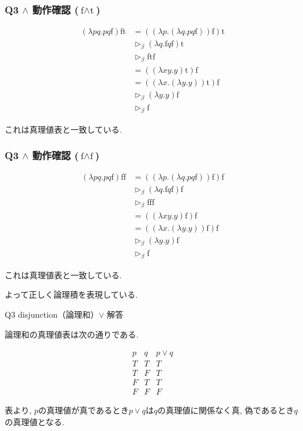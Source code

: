 \begin{frame}[fragile]

\frametitle{Q3 $\land$ 動作確認 ($\text{f}\land \text{t}$)}

\begin{align*}
(\lambda pq.pq\mathrm{f})\mathrm{ft}
&=
((\lambda p.(\lambda q.pq\mathrm{f}))
\mathrm{f})\mathrm{t}
\\
&\triangleright_{\beta}
(\lambda q.\mathrm{f}q\mathrm{f})\mathrm{t}
\\
&\triangleright_{\beta}
\mathrm{ftf}
\\
&=
((\lambda xy.y)\mathrm{t})\mathrm{f}
\\
&=
((\lambda x.(\lambda y.y))
\mathrm{t})\mathrm{f}
\\
&\triangleright_{\beta}
(\lambda y.y)\mathrm{f}
\\
&\triangleright_{\beta}
\mathrm{f}
\end{align*}

これは真理値表と一致している.

\end{frame}

\begin{frame}[fragile]

\frametitle{Q3 $\land$ 動作確認 ($\text{f}\land \text{f}$)}

\begin{align*}
(\lambda pq.pq\mathrm{f})\mathrm{ff}
&=
((\lambda p.(\lambda q.pq\mathrm{f}))
\mathrm{f})\mathrm{f}
\\
&\triangleright_{\beta}
(\lambda q.\mathrm{f}q\mathrm{f})\mathrm{f}
\\
&\triangleright_{\beta}
\mathrm{fff}
\\
&=
((\lambda xy.y)\mathrm{f})\mathrm{f}
\\
&=
((\lambda x.(\lambda y.y))
\mathrm{f})\mathrm{f}
\\
&\triangleright_{\beta}
(\lambda y.y)\mathrm{f}
\\
&\triangleright_{\beta}
\mathrm{f}
\end{align*}

これは真理値表と一致している.

よって正しく論理積を表現している.

\end{frame}
\begin{frame}{Q3 disjunction（論理和）$\lor$ 解答}

論理和の真理値表は次の通りである.

\[
\begin{array}{c|c|c}
p & q & p\lor q\\
\hline
T & T & T\\
T & F & T\\
F & T & T\\
F & F & F
\end{array}
\]

表より, $p$の真理値が真であるとき$p\lor q$は$q$の真理値に関係なく真, 偽であるとき$q$の真理値となる.

\end{frame}

